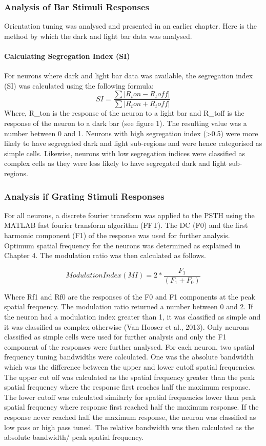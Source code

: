 				\subsubsection{Analysis of Bar Stimuli Responses}
				Orientation tuning was analysed and presented in an earlier chapter. Here is the method by which the dark and light bar data was analysed.
					\paragraph{Calculating Segregation Index (SI)}
					For neurons where dark and light bar data was available, the segregation index (SI) was calculated using the following formula: 
					\[SI=\frac{\sum|R_ton-R_toff|}{\sum|R_ton+R_toff|}\]
					Where, R\_ton is the response of the neuron to a light bar and R\_toff is the response of the neuron to a dark bar (see figure 1). The resulting value was a number between 0 and 1. Neurons with high segregation index (>0.5) were more likely to have segregated dark and light sub-regions and were hence categorised as simple cells. Likewise, neurons with low segregation indices were classified as complex cells as they were less likely to have segregated dark and light sub-regions.
				
				\subsubsection{Analysis if Grating Stimuli Responses}
				
				For all neurons, a discrete fourier transform was applied to the PSTH using the MATLAB fast fourier transform algorithm (FFT). The DC (F0) and the first harmonic component (F1) of the response was used for further analysis. Optimum spatial frequency for the neurons was determined as explained in Chapter 4. The modulation ratio was then calculated as follows.
				
				\[Modulation Index (MI)= 2*\frac{F_1}{(F_1+F_0)}\]
				
				Where Rf1 and Rf0 are the responses of the F0 and F1 components at the peak spatial frequency.
				The modulation ratio returned a number between 0 and 2. If the neuron had a modulation index greater than 1, it was classified as simple and it was classified as complex otherwise (Van Hooser et al., 2013). Only neurons classified as simple cells were used for further analysis and only the F1 component of the responses were further analysed.
				For each neuron, two spatial frequency tuning bandwidths were calculated. One was the absolute bandwidth which was the difference between the upper and lower cutoff spatial frequencies. The upper cut off was calculated as the spatial frequency greater than the peak spatial frequency where the response first reaches half the maximum response. The lower cutoff was calculated similarly for spatial frequencies lower than peak spatial frequency where response first reached half the maximum response. If the response never reached half the maximum response, the neuron was classified as low pass or high pass tuned. The relative bandwidth was then calculated as the absolute bandwidth/ peak spatial frequency.
				
